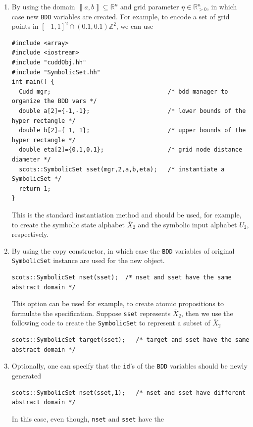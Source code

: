 \documentclass[a4paper]{amsart}
\newcommand{\segcc}[1]{\ensuremath{{\left\llbracket#1\right\rrbracket}}}
\newcommand{\intcc}[1]{\ensuremath{{\left[#1\right]}}}
\newcommand{\R}{\mathbb{R}}
\newcommand{\Z}{\mathbb{Z}}
\begin{document}
\begin{enumerate}
  \item By using the domain $\segcc{a,b}\subseteq \R^n$ and grid parameter
    $\eta\in\R^n_{>0}$, in which case new {\tt\small BDD} variables are created.
    For example, to encode a set of grid points in $\intcc{-1,1}^2\cap
    (0.1,0.1)\Z^2$, we can use
\begin{lstlisting}[basicstyle=\footnotesize\ttfamily]
#include <array>
#include <iostream>
#include "cuddObj.hh"
#include "SymbolicSet.hh"
int main() {
  Cudd mgr;                                 /* bdd manager to organize the BDD vars */    
  double a[2]={-1,-1};                      /* lower bounds of the hyper rectangle */
  double b[2]={ 1, 1};                      /* upper bounds of the hyper rectangle */
  double eta[2]={0.1,0.1};                  /* grid node distance diameter */
  scots::SymbolicSet sset(mgr,2,a,b,eta);   /* instantiate a SymbolicSet */
  return 1;
}
\end{lstlisting}
    This is the standard instantiation method and should be used, for example, to create
    the symbolic state alphabet $\bar X_2$ and the symbolic input alphabet $U_2$, respectively.
  \item By using the copy constructor, in which case the {\tt\small BDD} variables of original
    {\tt\small SymbolicSet} instance are used for the new object.
\begin{lstlisting}[basicstyle=\footnotesize\ttfamily]
  scots::SymbolicSet nset(sset);  /* nset and sset have the same abstract domain */
\end{lstlisting}
    This option can be used for example, to create atomic propositions to
    formulate the specification. Suppose {\tt\small sset} represents $\bar X_2$,
    then we use the following code to create the {\tt\small SymbolicSet} to represent a
    subset of $\bar X_2$
\begin{lstlisting}[basicstyle=\footnotesize\ttfamily]
  scots::SymbolicSet target(sset);   /* target and sset have the same abstract domain */
\end{lstlisting}
  \item Optionally, one can specify that the {\tt\small id}'s of the {\tt\small BDD} variables should be
    newly generated
\begin{lstlisting}[basicstyle=\footnotesize\ttfamily]
  scots::SymbolicSet nset(sset,1);   /* nset and sset have different abstract domain */
\end{lstlisting}
    In this case, even though, {\tt\small nset} and {\tt\small sset} have the

\end{enumerate}
\end{document}
